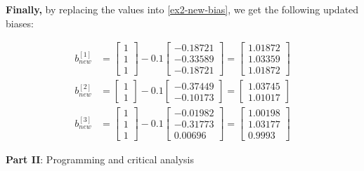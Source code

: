 \documentclass[12pt]{article}
\begin{document}
\begin{enumerate}[leftmargin=\labelsep]
        \textbf{Finally,} by replacing the values into \eqref{ex2-new-bias}, we get the following updated biases:

        \vskip -0.2cm
        \begin{align*}
          b^{[1]}_{new} & = \begin{bmatrix} 1 \\ 1 \\ 1 \end{bmatrix} - 0.1 \begin{bmatrix} -0.18721 \\ -0.33589 \\ -0.18721\end{bmatrix}
          = \begin{bmatrix} 1.01872 \\ 1.03359 \\ 1.01872\end{bmatrix}                                                                    \\
          b^{[2]}_{new} & = \begin{bmatrix} 1\\ 1\end{bmatrix} - 0.1 \begin{bmatrix} -0.37449 \\ -0.10173\end{bmatrix}
          = \begin{bmatrix} 1.03745 \\ 1.01017\end{bmatrix}                                                                               \\
          b^{[3]}_{new} & = \begin{bmatrix} 1 \\ 1 \\ 1\end{bmatrix} - 0.1 \begin{bmatrix} -0.01982 \\ -0.31773 \\ 0.00696\end{bmatrix}
          = \begin{bmatrix} 1.00198 \\ 1.03177 \\ 0.9993\end{bmatrix}
        \end{align*}
\end{enumerate}

\pagebreak

\begin{center}
  \large{\textbf{Part II}: Programming and critical analysis}\normalsize
\end{center}
\end{document}

